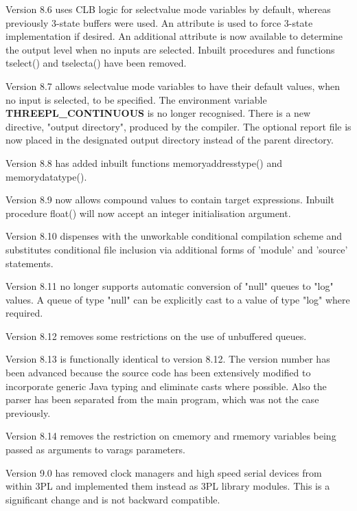        Version 8.6 uses CLB logic for selectvalue mode variables by default,
        whereas previously 3-state buffers were used. An attribute is used
        to force 3-state implementation if desired. An additional attribute
        is now available to determine the output level when no inputs are
        selected. Inbuilt procedures and functions tselect() and tselecta()
        have been removed.

        Version 8.7 allows selectvalue mode variables to have their default
        values, when no input is selected, to be specified. The environment
        variable {\bf THREEPL\_CONTINUOUS} is no longer recognised.
        There is a new directive, "output directory", produced by the
        compiler. The optional report file is now placed in the designated
        output directory instead of the parent directory.

        Version 8.8 has added inbuilt functions memoryaddresstype() and
        memorydatatype().

        Version 8.9 now allows compound values to contain target expressions.
        Inbuilt procedure float() will now accept an integer initialisation
        argument.

        Version 8.10 dispenses with the unworkable conditional compilation
        scheme and substitutes conditional file inclusion via additional
        forms of 'module' and 'source' statements.

        Version 8.11 no longer supports automatic conversion of "null" queues
        to "log" values. A queue of type "null" can be explicitly cast
        to a value of type "log" where required.

        Version 8.12 removes some restrictions on the use of unbuffered
        queues.

        Version 8.13 is functionally identical to version 8.12. The version
        number has been advanced because the source code has been extensively
        modified to incorporate generic Java typing and eliminate casts
        where possible. Also the parser has been separated from the main
        program, which was not the case previously.

        Version 8.14 removes the restriction on cmemory and rmemory variables
        being passed as arguments to varags parameters.

        Version 9.0 has removed clock managers and high speed serial devices
        from within 3PL and implemented them instead as 3PL library modules.
        This is a significant change and is not backward compatible.

